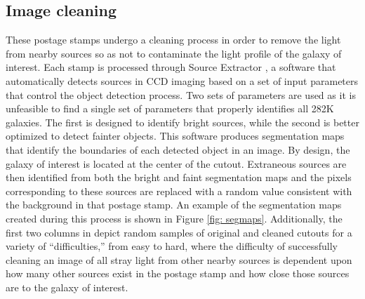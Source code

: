 \subsection{Image cleaning}
\label{chap2: image cleaning}

These postage stamps undergo a cleaning process in order to remove the light from nearby sources so as not to contaminate the light profile of the galaxy of interest. Each stamp is processed through Source Extractor \citep[SExtractor, ver. 2.8.6;][]{sextractor}, a software that automatically detects sources in CCD imaging based on a set of input parameters that control the object detection process. Two sets of parameters are used as it is unfeasible to find a single set of parameters that properly identifies all 282K galaxies. The first is designed to identify bright sources, while the second is better optimized to detect fainter objects. This software produces segmentation maps that identify the boundaries of each detected object in an image. By design, the galaxy of interest is located at the center of the cutout. Extraneous sources are then identified from both the bright and faint segmentation maps and the pixels corresponding to these sources are replaced with a random value consistent with the background in that postage stamp.  An example of the segmentation maps created during this process is shown in Figure \ref{fig: segmaps}. Additionally, the first two columns in  depict random samples of original and cleaned cutouts for a variety of ``difficulties,'' from easy to hard, where the difficulty of successfully cleaning an image of all stray light from other nearby sources is dependent upon how many other sources exist in the postage stamp and how close those sources are to the galaxy of interest. 


